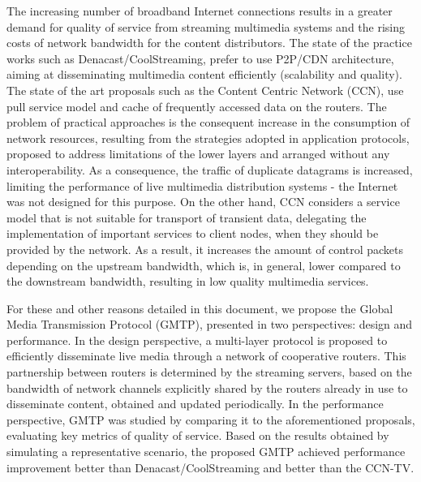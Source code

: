 The increasing number of broadband Internet connections results in a greater demand for quality of service from streaming multimedia systems and the rising costs of network bandwidth for the content distributors. The state of the practice works such as Denacast/CoolStreaming, prefer to use P2P/CDN architecture, aiming at disseminating multimedia content efficiently (scalability and quality). The state of the art proposals such as the Content Centric Network (CCN), use pull service model and cache of frequently accessed data on the routers. The problem of practical approaches is the consequent increase in the consumption of network resources, resulting from the strategies adopted in application protocols, proposed to address limitations of the lower layers and arranged without any interoperability. As a consequence, the traffic of duplicate datagrams is increased, limiting the performance of live multimedia distribution systems - the Internet was not designed for this purpose. On the other hand, CCN considers a service model that is not suitable for transport of transient data, delegating the implementation of important services to client nodes, when they should be provided by the network. As a result, it increases the amount of control packets depending on the upstream bandwidth, which is, in general, lower compared to the downstream bandwidth, resulting in low quality multimedia services.

For these and other reasons detailed in this document, we propose the Global Media Transmission Protocol (GMTP), presented in two perspectives: design and performance. In the design perspective, a multi-layer protocol is proposed to efficiently disseminate live media through a network of cooperative routers. This partnership between routers is determined by the streaming servers, based on the bandwidth of network channels explicitly shared by the routers already in use to disseminate content, obtained and updated periodically. In the performance perspective, GMTP was studied by comparing it to the aforementioned proposals, evaluating key metrics of quality of service. Based on the results obtained by simulating a representative scenario,  the proposed GMTP achieved  performance improvement  better than Denacast/CoolStreaming and  better than the CCN-TV.